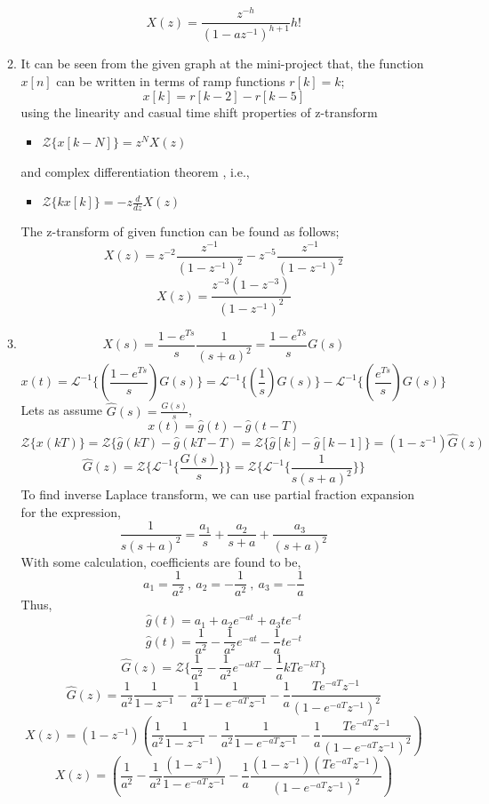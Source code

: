 \documentclass[a4paper,12pt]{article}
\begin{document}
\begin{enumerate}
\begin{enumerate}
			$$\boxed{	X(z)=\frac{z^{-h}}{{(1-az^{-1})}^{h+1}}h! }$$
			\item 	It can be seen from the given graph at the mini-project that, the function $x[n]$ can be written in terms of ramp functions $r[k]=k$; 
			$$\boxed{ x[k]=r[k-2]-r[k-5]	}$$
			using the linearity and casual time shift properties of z-transform 
			\begin{itemize}
				\item $	\mathcal{Z}\{x[k-N]\}=z^{N}X(z) $
			\end{itemize}
			and complex differentiation theorem , i.e.,
			\begin{itemize}
				\item $	\mathcal{Z}\{kx[k]\}=-z\frac{d}{dz} X(z)	$
			\end{itemize}
			The z-transform of given function can be found as follows;
			$$	X(z)=z^{-2}\frac{z^{-1}}{({1-z^{-1}})^2}-z^{-5}\frac{z^{-1}}{({1-z^{-1}})^2}	$$
			$$\boxed{	X(z)=\frac{z^{-3}(1-z^{-3})}{({1-z^{-1}})^2}	}$$
			
			\item
			$$ X(s)=\frac{1-e^{Ts}}{s}\frac{1}{(s+a)^2}=\frac{1-e^{Ts}}{s}G(s)$$
			$$	x(t)=\mathcal{L}^{-1}\{ (\frac{1-e^{Ts}}{s}) G(s) \}=\mathcal{L}^{-1}\{ (\frac{1}{s}) G(s) \}-\mathcal{L}^{-1}\{ (\frac{e^{Ts}}{s}) G(s) \}	$$
			Lets as assume $\hat{G}(s)=\frac{G(s)}{s}$, 
			$$ x(t)=\hat{g}(t)-\hat{g}(t-T) $$
			$$ \mathcal{Z}\{ x(kT) \}=\mathcal{Z}\{ \hat{g}(kT)-\hat{g}(kT-T)=\mathcal{Z}\{ \hat{g}[k]-\hat{g}[k-1]\}=(1-z^{-1})\hat{G}(z) $$
			$$ 	\hat{G}(z)= \mathcal{Z}\{ \mathcal{L}^{-1} \{ \frac{G(s)}{s}\}\}=\mathcal{Z}\{ \mathcal{L}^{-1} \{ \frac{1}{s(s+a)^2} \}\}$$
			To find inverse Laplace transform, we can use partial fraction expansion for the expression, 		
			$$   \frac{1}{s(s+a)^2}  = \frac{a_1}{s}+\frac{a_2}{s+a}+\frac{a_3}{{(s+a)}^2} $$
			With some calculation, coefficients are found to be, \\
			$$ \boxed{a_1=\frac{1}{a^2}} \ ,\ \boxed{a_2=-\frac{1}{a^2}}\ ,\ \boxed{a_3=-\frac{1}{a}} $$			
			Thus,
			$$  \hat{g}(t)  = a_1 +a_2 e^{-at}+ a_3te^{-t} $$
			$$	\hat{g}(t)  = \frac{1}{a^2} -\frac{1}{a^2} e^{-at}-\frac{1}{a}te^{-t} $$	 
			$$ 	\hat{G}(z)= \mathcal{Z}\{ \frac{1}{a^2} -\frac{1}{a^2} e^{-akT}-\frac{1}{a}kTe^{-kT}  \} $$
			$$ 	\hat{G}(z)= \frac{1}{a^2} \frac{1}{1-z^{-1}} - \frac{1}{a^2} \frac{1}{1-e^{-aT}z^{-1}} - \frac{1}{a} \frac{Te^{-aT}z^{-1}}{{(1-e^{-aT}z^{-1})}^2}	$$
			$$	X(z)=(1-z^{-1})(\frac{1}{a^2} \frac{1}{1-z^{-1}} - \frac{1}{a^2} \frac{1}{1-e^{-aT}z^{-1}} - \frac{1}{a} \frac{Te^{-aT}z^{-1}}{{(1-e^{-aT}z^{-1})}^2}	)		$$ 
			$$\boxed{	X(z)=(\frac{1}{a^2} - \frac{1}{a^2} \frac{(1-z^{-1})}{1-e^{-aT}z^{-1}} - \frac{1}{a} \frac{(1-z^{-1})(Te^{-aT}z^{-1})}{{(1-e^{-aT}z^{-1})}^2}	)		}$$ 	
		\end{enumerate}
	

\end{enumerate}
\end{document}
